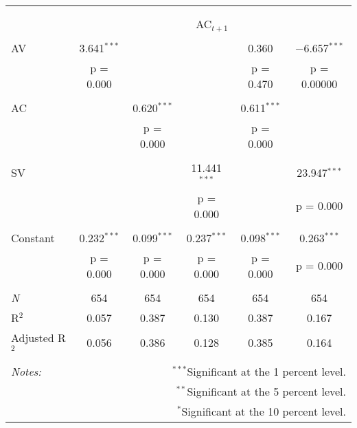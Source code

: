 
\begin{tabular}{@{\extracolsep{5pt}}lccccc} 
\\[-1.8ex]\hline 
\hline \\[-1.8ex] 
\\[-1.8ex] & \multicolumn{5}{c}{AC$_{t+1}$} \\ 
\hline \\[-1.8ex] 
 AV & 3.641$^{***}$ &  &  & 0.360 & $-$6.657$^{***}$ \\ 
  & p = 0.000 &  &  & p = 0.470 & p = 0.00000 \\ 
  & & & & & \\ 
 AC &  & 0.620$^{***}$ &  & 0.611$^{***}$ &  \\ 
  &  & p = 0.000 &  & p = 0.000 &  \\ 
  & & & & & \\ 
 SV &  &  & 11.441$^{***}$ &  & 23.947$^{***}$ \\ 
  &  &  & p = 0.000 &  & p = 0.000 \\ 
  & & & & & \\ 
 Constant & 0.232$^{***}$ & 0.099$^{***}$ & 0.237$^{***}$ & 0.098$^{***}$ & 0.263$^{***}$ \\ 
  & p = 0.000 & p = 0.000 & p = 0.000 & p = 0.000 & p = 0.000 \\ 
  & & & & & \\ 
\textit{N} & 654 & 654 & 654 & 654 & 654 \\ 
R$^{2}$ & 0.057 & 0.387 & 0.130 & 0.387 & 0.167 \\ 
Adjusted R$^{2}$ & 0.056 & 0.386 & 0.128 & 0.385 & 0.164 \\ 
\hline 
\hline \\[-1.8ex] 
\textit{Notes:} & \multicolumn{5}{r}{$^{***}$Significant at the 1 percent level.} \\ 
 & \multicolumn{5}{r}{$^{**}$Significant at the 5 percent level.} \\ 
 & \multicolumn{5}{r}{$^{*}$Significant at the 10 percent level.} \\ 
\end{tabular} 
